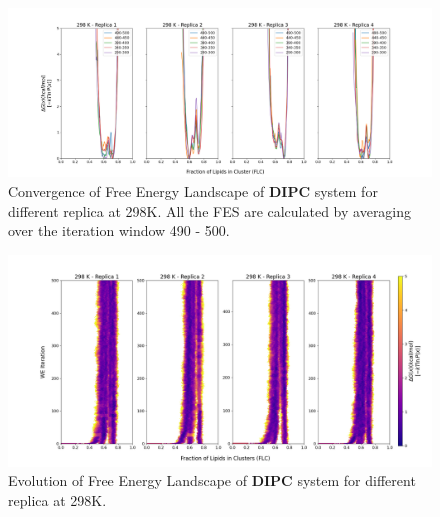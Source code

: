 \documentclass{biophys-new}
\begin{document}
\begin{figure}[hbt!]
\centering
\includegraphics[width=1.1\linewidth]{all_plots/ClusterLipids2Total/DPPC_DIPC_CHOL/298K/Convergence_DIPC_298_ClusterLipids2Total.png}
\caption{Convergence of Free Energy Landscape of \textbf{DIPC} system for different replica at 298K. All the FES are calculated by averaging over the iteration window 490 - 500.}
\label{fig:view}

\end{figure}

\begin{figure}[hbt!]
\centering
\includegraphics[width=1.1\linewidth]{all_plots/ClusterLipids2Total/DPPC_DIPC_CHOL/298K/Evolution_DIPC_298_ClusterLipids2Total.png}
\caption{Evolution of Free Energy Landscape of \textbf{DIPC} system for different replica at 298K.}
\label{fig:view}

\end{figure}
\end{document}
